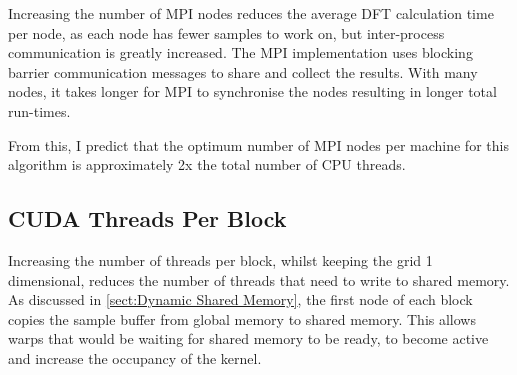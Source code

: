 \documentclass[11pt,a4paper]{article}
\begin{document}
Increasing the number of MPI nodes reduces the average DFT calculation time per node, as each node has fewer samples to work on, but inter-process communication is greatly increased. The MPI implementation uses blocking barrier communication messages to share and collect the results. With many nodes, it takes longer for MPI to synchronise the nodes resulting in longer total run-times.

From this, I predict that the optimum number of MPI nodes per machine for this algorithm is approximately 2x the total number of CPU threads.

\subsection{CUDA Threads Per Block}
Increasing the number of threads per block, whilst keeping the grid 1 dimensional, reduces the number of threads that need to write to shared memory. As discussed in \ref{sect:Dynamic Shared Memory}, the first node of each block copies the sample buffer from global memory to shared memory. This allows warps that would be waiting for shared memory to be ready, to become active and increase the occupancy of the kernel.

\begin{figure}[H]%
    \centering
    \qquad
    \vspace{5pt}
    \caption{}%
    \label{fig:cuda_threads_per_block}%
\end{figure}
\end{document}
